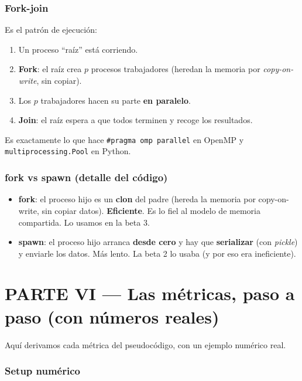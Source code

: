 \documentclass[11pt,a4paper]{article}
\newcommand{\term}[1]{\textbf{\textcolor{clave}{#1}}}
\begin{document}
\section{Fork-join}

Es el patrón de ejecución:
\begin{enumerate}
  \item Un proceso ``raíz'' está corriendo.
  \item \textbf{Fork}: el raíz crea $p$ procesos trabajadores (heredan la
        memoria por \emph{copy-on-write}, sin copiar).
  \item Los $p$ trabajadores hacen su parte \textbf{en paralelo}.
  \item \textbf{Join}: el raíz espera a que todos terminen y recoge los
        resultados.
\end{enumerate}
Es exactamente lo que hace \texttt{\#pragma omp parallel} en OpenMP y
\texttt{multiprocessing.Pool} en Python.

\section{fork vs spawn (detalle del código)}

\begin{itemize}
  \item \term{fork}: el proceso hijo es un \textbf{clon} del padre (hereda la
        memoria por copy-on-write, sin copiar datos). \textbf{Eficiente}. Es lo
        fiel al modelo de memoria compartida. Lo usamos en la beta 3.
  \item \term{spawn}: el proceso hijo arranca \textbf{desde cero} y hay que
        \textbf{serializar} (con \emph{pickle}) y enviarle los datos. Más lento.
        La beta 2 lo usaba (y por eso era ineficiente).
\end{itemize}

\part*{PARTE VI --- Las métricas, paso a paso (con números reales)}

Aquí derivamos cada métrica del pseudocódigo, con un ejemplo numérico real.

\section{Setup numérico}
\end{document}
